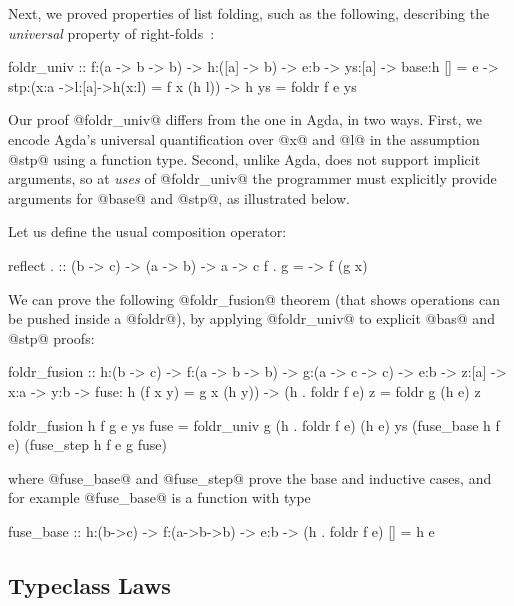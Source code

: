 %
Next, we proved properties of list folding, such as
the following, describing the \emph{universal}
property of right-folds~\citep{agdaequational}:
%
\begin{code}
foldr_univ
  :: f:(a -> b -> b)
  -> h:([a] -> b)
  -> e:b
  -> ys:[a]
  -> base:{h [] = e }
  -> stp:(x:a ->l:[a]->{h(x:l) = f x (h l)})
  -> {h ys = foldr f e ys}
\end{code}
%
Our proof @foldr_univ@ differs from the one in Agda,
in two ways.
%
First, we encode Agda's universal quantification over
@x@ and @l@ in the assumption @stp@ using a function type.
%
Second, unlike Agda, \toolname
does not support implicit arguments,
so at \emph{uses} of @foldr_univ@
the programmer must explicitly
provide arguments for @base@
and @stp@, as illustrated below.

%
Let us define the usual composition operator:
%
\begin{code}
reflect . :: (b -> c) -> (a -> b) -> a -> c
f . g     = \x -> f (g x)
\end{code}
%
We can prove the following @foldr_fusion@ theorem
(that shows operations can be pushed inside a @foldr@),
by applying @foldr_univ@ to explicit @bas@ and @stp@ proofs:
%
\begin{code}
  foldr_fusion
   :: h:(b -> c)
   -> f:(a -> b -> b)
   -> g:(a -> c -> c)
   -> e:b -> z:[a] -> x:a -> y:b
   -> fuse: {h (f x y) = g x (h y)})
   -> {(h . foldr f e) z = foldr g (h e) z}

  foldr_fusion h f g e ys fuse
    = foldr_univ g (h . foldr f e) (h e) ys
        (fuse_base h f e)
        (fuse_step h f e g fuse)
\end{code}
%
where @fuse_base@ and @fuse_step@ prove the
base and inductive cases, and for example
@fuse_base@ is a function with type
%
\begin{code}
fuse_base :: h:(b->c) -> f:(a->b->b) -> e:b
          -> {(h . foldr f e) [] = h e}
\end{code}

\subsection{Typeclass Laws}

